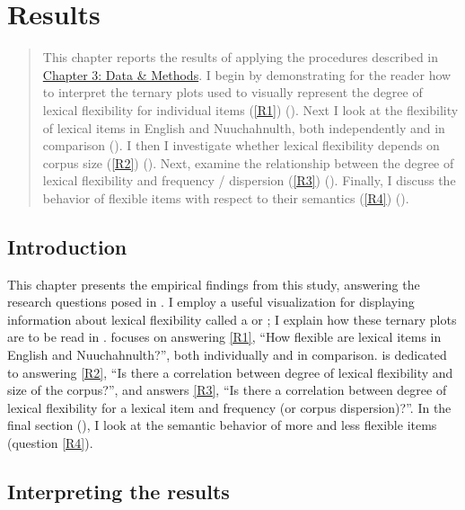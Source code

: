 \chapter{Results}
\label{ch:results}

\blockquote{This chapter reports the results of applying the procedures described in \hyperref[ch:methods]{Chapter 3: Data \& Methods}. I begin by demonstrating for the reader how to interpret the ternary plots used to visually represent the degree of lexical flexibility for individual items (\ref{R1}) (). Next I look at the flexibility of lexical items in English and Nuuchahnulth, both independently and in comparison (). I then I investigate whether lexical flexibility depends on corpus size (\ref{R2}) (). Next, examine the relationship between the degree of lexical flexibility and frequency / dispersion (\ref{R3}) (). Finally, I discuss the behavior of flexible items with respect to their semantics (\ref{R4}) ().}

\section{Introduction}
\label{sec:4.1}

This chapter presents the empirical findings from this study, answering the research questions posed in . I employ a useful visualization for displaying information about lexical flexibility called a  or ; I explain how these ternary plots are to be read in .  focuses on answering \ref{R1}, \enquote{How flexible are lexical items in English and Nuuchahnulth?}, both individually and in comparison.  is dedicated to answering \ref{R2}, \enquote{Is there a correlation between degree of lexical flexibility and size of the corpus?}, and  answers \ref{R3}, \enquote{Is there a correlation between degree of lexical flexibility for a lexical item and frequency (or corpus dispersion)?}. In the final section (), I look at the semantic behavior of more and less flexible items (question \ref{R4}).

\section{Interpreting the results}
\label{sec:4.2}

